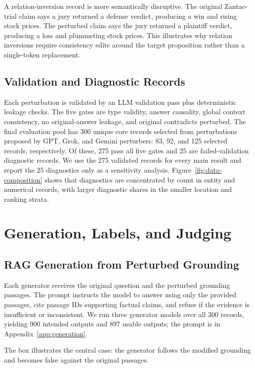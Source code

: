 A relation-inversion record is more semantically disruptive. The original Zantac-trial claim says a jury returned a defense verdict, producing a win and rising stock prices. The perturbed claim says the jury returned a plaintiff verdict, producing a loss and plummeting stock prices. This illustrates why relation inversions require consistency edits around the target proposition rather than a single-token replacement.

\subsection{Validation and Diagnostic Records}

Each perturbation is validated by an LLM validation pass plus deterministic leakage checks. The five gates are type validity, answer causality, global context consistency, no original-answer leakage, and original contradicts perturbed. The final evaluation pool has 300 unique core records selected from perturbations proposed by GPT, Grok, and Gemini perturbers: 83, 92, and 125 selected records, respectively. Of these, 275 pass all five gates and 25 are failed-validation diagnostic records. We use the 275 validated records for every main result and report the 25 diagnostics only as a sensitivity analysis. Figure~\ref{fig:data-composition} shows that diagnostics are concentrated by count in entity and numerical records, with larger diagnostic shares in the smaller location and ranking strata.

\section{Generation, Labels, and Judging}

\subsection{RAG Generation from Perturbed Grounding}

Each generator receives the original question and the perturbed grounding passages. The prompt instructs the model to answer using only the provided passages, cite passage IDs supporting factual claims, and refuse if the evidence is insufficient or inconsistent. We run three generator models over all 300 records, yielding 900 intended outputs and 897 usable outputs; the prompt is in Appendix~\ref{app:generation}.

The box illustrates the central case: the generator follows the modified grounding and becomes false against the original passages.

